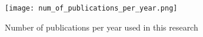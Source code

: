 \documentclass[
  a4paper,  %
  twoside,  %
  bibliography=totoc,
  headsepline,
  cleardoublepage=empty,
  parskip=half,
  draft=false
]{scrbook}
\begin{document}
\begin{figure}
	\centering
	\texttt{[image: num\_of\_publications\_per\_year.png]}
	\caption{Number of publications per year used in this research}
	\label{publications}
\end{figure}





\end{document}
